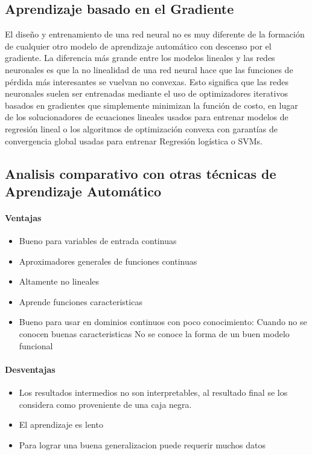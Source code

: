 \documentclass[a4paper,11pt,spanish]{book}
\begin{document}
      \subsection{Aprendizaje basado en el Gradiente}
	El diseño y entrenamiento de una red neural no es muy diferente de la formación de cualquier otro modelo de aprendizaje automático con descenso por el gradiente.
	La diferencia más grande entre los modelos lineales y las redes neuronales es que la no linealidad de una red neural hace que las funciones de pérdida 
	más interesantes se vuelvan no convexas. Esto significa que las redes neuronales suelen ser entrenadas mediante el uso de optimizadores iterativos basados ​​en gradientes 
	que simplemente minimizan la función de costo, en lugar de los solucionadores de ecuaciones lineales usados ​​para entrenar modelos de regresión lineal o los algoritmos de optimización 
	convexa con garantías de convergencia global usadas para entrenar Regresión logística o SVMs.
      
      \subsection{Analisis comparativo con otras técnicas de Aprendizaje Automático}
	\paragraph {Ventajas}
	  \begin{itemize}
	    \item Bueno para variables de entrada continuas
	    \item Aproximadores generales de funciones continuas
	    \item Altamente no lineales
	    \item Aprende funciones caracteristicas
	    \item Bueno para usar en dominios continuos con poco conocimiento:
	      \subitem Cuando no se conocen buenas caracteristicas
	      \subitem No se conoce la forma de un buen modelo funcional
	  \end{itemize}
	\paragraph {Desventajas}
	  \begin{itemize}
	    \item Los resultados intermedios no son interpretables, al resultado final se los considera como proveniente de una caja negra.
	    \item El aprendizaje es lento
	    \item Para lograr una buena generalizacion puede requerir muchos datos
	  \end{itemize}
\end{document}
